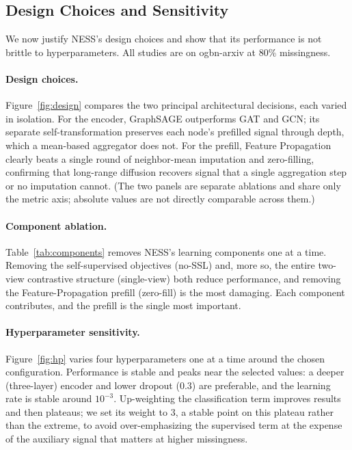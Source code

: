 \subsection{Design Choices and Sensitivity}
\label{sec:exp-design}

We now justify NESS's design choices and show that its performance is not brittle to hyperparameters. All studies are on ogbn-arxiv at $80\%$ missingness.

\paragraph{Design choices.} Figure~\ref{fig:design} compares the two principal architectural decisions, each varied in isolation. For the encoder, GraphSAGE outperforms GAT and GCN; its separate self-transformation preserves each node's prefilled signal through depth, which a mean-based aggregator does not. For the prefill, Feature Propagation clearly beats a single round of neighbor-mean imputation and zero-filling, confirming that long-range diffusion recovers signal that a single aggregation step or no imputation cannot. (The two panels are separate ablations and share only the metric axis; absolute values are not directly comparable across them.)

\paragraph{Component ablation.} Table~\ref{tab:components} removes NESS's learning components one at a time. Removing the self-supervised objectives (no-SSL) and, more so, the entire two-view contrastive structure (single-view) both reduce performance, and removing the Feature-Propagation prefill (zero-fill) is the most damaging. Each component contributes, and the prefill is the single most important.

\paragraph{Hyperparameter sensitivity.} Figure~\ref{fig:hp} varies four hyperparameters one at a time around the chosen configuration. Performance is stable and peaks near the selected values: a deeper (three-layer) encoder and lower dropout ($0.3$) are preferable, and the learning rate is stable around $10^{-3}$. Up-weighting the classification term improves results and then plateaus; we set its weight to $3$, a stable point on this plateau rather than the extreme, to avoid over-emphasizing the supervised term at the expense of the auxiliary signal that matters at higher missingness.

